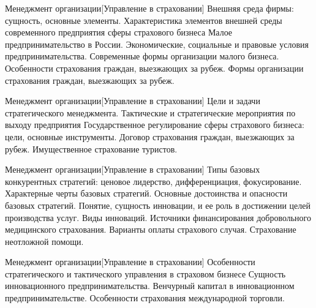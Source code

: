 \documentclass[
	11pt,
	a4paper,
	]
	{article}
\begin{document}
\vfill



\begin{minipage}[t][\miniH]{\miniL}\centering
	 {Менеджмент организации}[Управление в страховании]
		{
			Внешняя среда фирмы: сущность, основные элементы. Характеристика элементов внешней среды современного предприятия сферы страхового бизнеса
		}{
			Малое предпринимательство в России. Экономические, социальные и правовые условия предпринимательства. Современные формы организации малого бизнеса.
		}{
			Особенности страхования граждан, выезжающих за рубеж. Формы организации страхования граждан, выезжающих за рубеж.
		}
	\lowGE
\end{minipage}





\begin{minipage}[t][\miniH]{\miniL}\centering
	 {Менеджмент организации}[Управление в страховании]
		{
			Цели и задачи стратегического менеджмента. Тактические и стратегические мероприятия по выходу предприятия
		}{
			Государственное регулирование сферы страхового бизнеса: цели, основные инструменты.
		}{
			Договор страхования граждан, выезжающих за рубеж. Имущественное страхование туристов.
		}
	\lowGE
\end{minipage}

\vfill



\begin{minipage}[t][\miniH]{\miniL}\centering
	 {Менеджмент организации}[Управление в страховании]
		{
			Типы базовых конкурентных стратегий: ценовое лидерство, дифференциация, фокусирование. Характерные черты базовых стратегий. Основные достоинства и опасности базовых стратегий.
		}{
			Понятие, сущность инновации, и ее роль в достижении целей производства услуг. Виды инноваций.
		}{
			Источники финансирования добровольного медицинского страхования. Варианты оплаты страхового случая. Страхование неотложной помощи.
		}
	\lowGE
\end{minipage}

\vfill



\begin{minipage}[t][\miniH]{\miniL}\centering
	 {Менеджмент организации}[Управление в страховании]
		{
			Особенности стратегического и тактического управления в страховом бизнесе
		}{
			Сущность инновационного предпринимательства. Венчурный капитал в инновационном предпринимательстве.
		}{
			Особенности страхования международной торговли.
		}
	\lowGE
\end{minipage}
\end{document}
